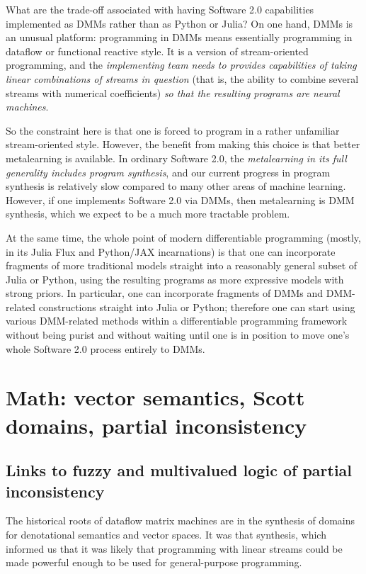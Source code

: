 \documentclass{article}
\begin{document}
What are the trade-off associated with having Software 2.0 capabilities implemented as DMMs rather
than as Python or Julia? On one hand, DMMs is an unusual platform: programming in DMMs
means essentially programming in dataflow or functional reactive style. It is a version of
stream-oriented programming, and the {\em implementing team needs to provides capabilities of taking linear
combinations of streams in question} (that is, the ability to combine several streams with
numerical coefficients) {\em so that the resulting programs are neural machines}.

So the constraint here is that one is forced to program in a rather unfamiliar stream-oriented style.
However, the benefit from making this choice is that better metalearning is available. In ordinary Software 2.0,
the {\em metalearning in its full generality includes program synthesis}, and our current progress in
program synthesis is relatively slow compared to many other areas of machine learning.
However, if one implements Software 2.0 via DMMs, then metalearning is DMM synthesis,
which we expect to be a much more tractable problem.

At the same time, the whole point of modern differentiable programming (mostly, in its Julia Flux and Python/JAX
incarnations) is that one can incorporate fragments of more traditional models straight into a reasonably general subset of
Julia or Python, using the resulting programs as more expressive models with strong priors. In particular, one can incorporate fragments of DMMs and DMM-related constructions straight into
Julia or Python; therefore one can start using various DMM-related methods within a differentiable programming
framework without being purist and without
waiting until one is in position to move one's whole Software 2.0 process entirely to DMMs. 

\section{Math: vector semantics, Scott domains, partial inconsistency}

\subsection{Links to fuzzy and multivalued logic of
partial inconsistency}

The historical roots of dataflow matrix machines are in the synthesis of domains
for denotational semantics and vector spaces. It was that synthesis, which informed us that it was likely
that programming with linear streams could be made powerful enough to be used for general-purpose programming.
\end{document}
